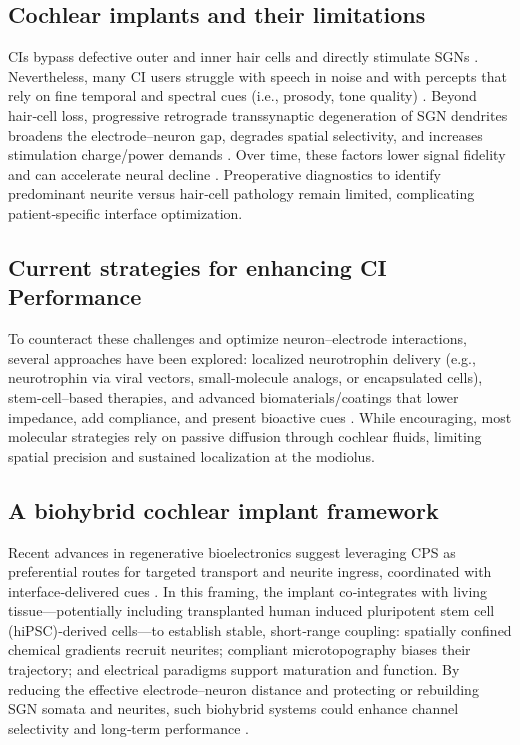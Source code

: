 \documentclass[referee,pdflatex, sn-vancouver-num]{sn-jnl}%
\theoremstyle{thmstyleone}%
\theoremstyle{thmstyletwo}%
\theoremstyle{thmstylethree}%
\DeclareRobustCommand{\textendash}{\ifmmode\text{-}\else\leavevmode\hbox{--}\fi}
\begin{document}
\subsection{Cochlear implants and their limitations}
CIs bypass defective outer and inner hair cells and directly stimulate SGNs \cite{wilson2014}. Nevertheless, many CI users struggle with speech in noise and with percepts that rely on fine temporal and spectral cues (i.e., prosody, tone quality) \cite{Hwa2021}. Beyond hair‑cell loss, progressive retrograde transsynaptic degeneration of SGN dendrites broadens the electrode\textendash neuron gap, degrades spatial selectivity, and increases stimulation charge/power demands \cite{Nadol1989}. Over time, these factors lower signal fidelity and can accelerate neural decline \cite{glueckert2008,Micco2006,Vecchi2024}. Preoperative diagnostics to identify predominant neurite versus hair‑cell pathology remain limited, complicating patient‑specific interface optimization.

\subsection{Current strategies for enhancing CI Performance}
To counteract these challenges and optimize neuron–electrode interactions, several approaches have been explored: localized neurotrophin delivery (e.g., neurotrophin via viral vectors, small‑molecule analogs, or encapsulated cells), stem‑cell–based therapies, and advanced biomaterials/coatings that lower impedance, add compliance, and present bioactive cues \cite{Scheper2019,Chang2020,Kempfle2021,StPeter2022,Horne2023, Vecchi2024}. While encouraging, most molecular strategies rely on passive diffusion through cochlear fluids, limiting spatial precision and sustained localization at the modiolus.

\subsection{A biohybrid cochlear implant framework}
Recent advances in regenerative bioelectronics suggest leveraging CPS as preferential routes for targeted transport and neurite ingress, coordinated with interface‑delivered cues \cite{CarnicerLombarte2024AdvMat}. In this framing, the implant co‑integrates with living tissue—potentially including transplanted human induced pluripotent stem cell (hiPSC)‑derived cells—to establish stable, short‑range coupling: spatially confined chemical gradients recruit neurites; compliant microtopography biases their trajectory; and electrical paradigms support maturation and function. By reducing the effective electrode–neuron distance and protecting or rebuilding SGN somata and neurites, such biohybrid systems could enhance channel selectivity and long‑term performance \cite{Nella2022NeurotrophinGradients, Fenov2024}.
\end{document}
